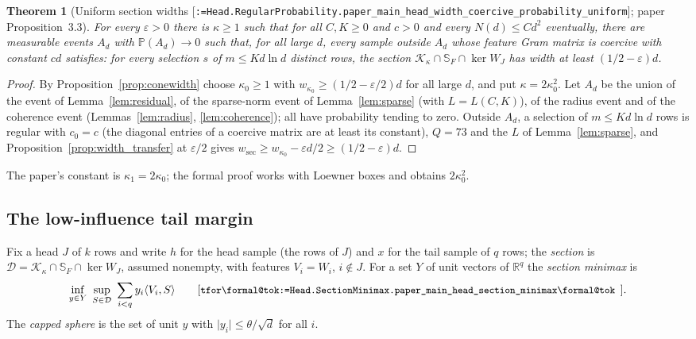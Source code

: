 \documentclass[11pt]{article}
\makeatletter
\newcommand{\formal@break}[1]{\@tfor\formal@tok:=#1\do{%
  \formal@tok
  \expandafter\ifx\formal@tok.\allowbreak\else
  \expandafter\ifx\formal@tok\_\allowbreak\fi\fi}}
\DeclareRobustCommand{\formal}[1]{\textnormal{[\texttt{\small\formal@break{#1}}]}}
\newcommand{\R}{\mathbb{R}}
\newcommand{\Prob}{\mathbb{P}}
\newcommand{\ip}[2]{\langle #1, #2\rangle}
\newcommand{\abs}[1]{\lvert #1\rvert}
\newcommand{\Fro}{F}
\newcommand{\sqd}{\sqrt{d}}
\newcommand{\cone}{\mathcal{K}}
\theoremstyle{plain}
\newtheorem{theorem}{Theorem}[section]
\theoremstyle{definition}
\makeatother
\begin{document}
\begin{theorem}[Uniform section widths \formal{Head.RegularProbability.paper\_main\_head\_width\_coercive\_probability\_uniform}; paper Proposition~3.3]\label{thm:heads}
For every $\varepsilon > 0$ there is $\kappa \ge 1$ such that for all
$C, K \ge 0$ and $c > 0$ and every $N(d) \le Cd^2$ eventually, there are
measurable events $A_d$ with $\Prob(A_d) \to 0$ such that, for all large
$d$, every sample outside $A_d$ whose feature Gram matrix is coercive with
constant $cd$ satisfies: for every selection $s$ of $m \le Kd\ln d$ distinct
rows, the section $\cone_\kappa\cap\mathbb{S}_\Fro\cap\ker W_J$ has width at
least $(1/2 - \varepsilon)d$.
\end{theorem}

\begin{proof}
By Proposition~\ref{prop:conewidth} choose $\kappa_0 \ge 1$ with
$w_{\kappa_0} \ge (1/2 - \varepsilon/2)d$ for all large $d$, and put
$\kappa = 2\kappa_0^2$. Let $A_d$ be the union of the event of
Lemma~\ref{lem:residual}, of the sparse-norm event of Lemma~\ref{lem:sparse}
(with $L = L(C, K)$), of the radius event and of the coherence event
(Lemmas~\ref{lem:radius}, \ref{lem:coherence}); all have probability
tending to zero. Outside $A_d$, a selection of $m \le Kd\ln d$ rows is
regular with $c_0 = c$ (the diagonal entries of a coercive matrix are at
least its constant), $Q = 73$ and the $L$ of Lemma~\ref{lem:sparse}, and
Proposition~\ref{prop:width_transfer} at $\varepsilon/2$ gives
$w_{\mathrm{sec}} \ge w_{\kappa_0} - \varepsilon d/2 \ge (1/2 - \varepsilon)d$.
\end{proof}

The paper's constant is $\kappa_1 = 2\kappa_0$; the formal proof works with
Loewner boxes and obtains $2\kappa_0^2$.

\subsection{The low-influence tail margin}\label{sec:lowinf}

Fix a head $J$ of $k$ rows and write $h$ for the head sample (the rows of
$J$) and $x$ for the tail sample of $q$ rows; the \emph{section} is
$\mathcal{D} = \cone_\kappa\cap\mathbb{S}_\Fro\cap\ker W_J$, assumed
nonempty, with features $V_i = W_i$, $i \notin J$. For a set $Y$ of unit
vectors of $\R^q$ the \emph{section minimax} is
\[
\inf_{y\in Y}\ \sup_{S\in\mathcal{D}}\ \sum_{i<q}y_i\ip{V_i}{S}
\tag*{\formal{Head.SectionMinimax.paper\_main\_head\_section\_minimax}.}
\]
The \emph{capped sphere} is the set of unit $y$ with $\abs{y_i} \le \theta/\sqd$
for all $i$.
\end{document}
